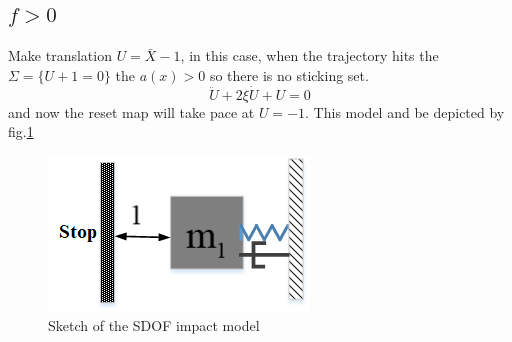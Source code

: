 \documentclass{article}
\begin{document}
\subsection{$f>0$}
Make translation $U=\bar X-1$, in this case, when the trajectory hits the $\Sigma=\{ U+1=0\}$ the $a(x)>0$ so there is no sticking set.
\begin{equation}
    \ddot U+2\xi \dot U+U=0
    \label{eq:generalized 1dof equation}
\end{equation}
 and now the reset map will take pace at $U=-1$. This model and be depicted by fig.\ref{fig:SDof Model}
 \begin{figure}
     \centering
     \includegraphics[width= 0.5 \textwidth]{pictures/SDOF_model.png}
     \caption{Sketch of the SDOF impact model}
     \label{fig:SDof Model}
 \end{figure}
 
\end{document}
